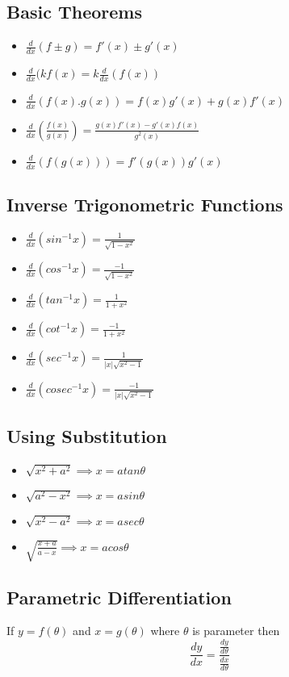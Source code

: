 \documentclass[twocolumn, 10pt]{article}
\begin{document}
\subsection{Basic Theorems}
\begin{itemize}
\item $\frac{d}{dx} (f \pm g)=f'(x) \pm g'(x)$
\item $\frac{d}{dx} (kf(x)=k\frac{d}{dx}(f(x))$
\item $\frac{d}{dx} (f(x).g(x))=f(x)g'(x)+g(x)f'(x)$
\item $\frac{d}{dx} (\frac{f(x)}{g(x)})=\frac{g(x)f'(x)-g'(x)f(x)}{g^2(x)}$
\item $\frac{d}{dx} (f(g(x)))=f'(g(x))g'(x)$
\end{itemize}
\subsection{Inverse Trigonometric Functions}
\begin{itemize}
\item $\frac{d}{dx} (sin^{-1}x)=\frac{1}{\sqrt{1-x^2}}$
\item $\frac{d}{dx} (cos^{-1}x)=\frac{-1}{\sqrt{1-x^2}}$
\item $\frac{d}{dx} (tan^{-1}x)=\frac{1}{1+x^2}$
\item $\frac{d}{dx} (cot^{-1}x)=\frac{-1}{1+x^2}$
\item $\frac{d}{dx} (sec^{-1}x)=\frac{1}{|x| \sqrt{x^2-1}}$
\item $\frac{d}{dx} (cosec^{-1}x)=\frac{-1}{|x| \sqrt{x^2-1}}$
\end{itemize}
\subsection{Using Substitution}
\begin{itemize}
\item  $\sqrt{x^2+a^2} \implies x=atan \theta$
\item  $\sqrt{a^2-x^2} \implies x=asin \theta$
\item  $\sqrt{x^2-a^2} \implies x=asec \theta$
\item  $\sqrt{\frac{x+a}{a-x}} \implies x=acos \theta$
\end{itemize}
\subsection{Parametric Differentiation}
If $y=f(\theta)$ and $x=g(\theta)$ where $\theta$ is parameter then
$$\frac{dy}{dx} = \frac{\frac{dy}{d\theta}}{\frac{dx}{d\theta}}$$
\end{document}
